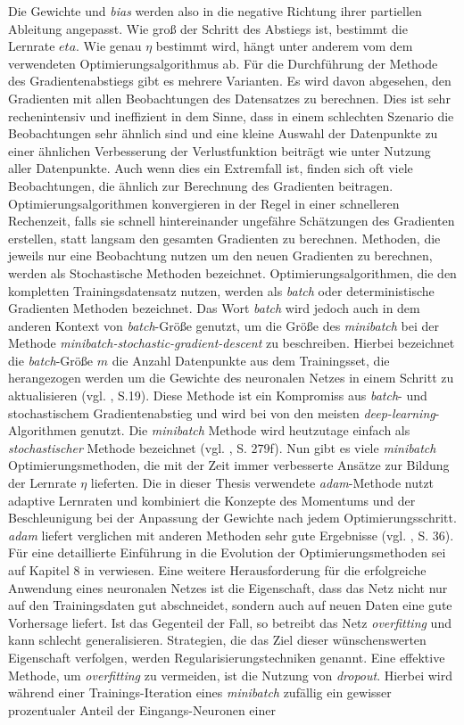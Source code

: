 \documentclass[a4paper,11pt]{article}
\begin{document}
Die Gewichte und \textit{bias} werden also in die negative Richtung ihrer partiellen Ableitung angepasst. Wie groß der Schritt des Abstiegs ist, bestimmt die Lernrate $eta$. 
Wie genau $\eta$ bestimmt wird, hängt unter anderem vom dem verwendeten Optimierungsalgorithmus ab. Für die Durchführung der Methode des Gradientenabstiegs gibt es mehrere Varianten. Es wird davon abgesehen, den Gradienten mit allen Beobachtungen des Datensatzes zu berechnen. Dies ist sehr rechenintensiv und ineffizient in dem Sinne, dass in einem schlechten Szenario die Beobachtungen sehr ähnlich sind und eine kleine Auswahl der Datenpunkte zu einer ähnlichen Verbesserung der Verlustfunktion beiträgt wie unter Nutzung aller Datenpunkte. Auch wenn dies ein Extremfall ist, finden sich oft viele Beobachtungen, die ähnlich zur Berechnung des Gradienten beitragen. Optimierungsalgorithmen konvergieren in der Regel in einer schnelleren Rechenzeit, falls sie schnell hintereinander ungefähre Schätzungen des Gradienten erstellen, statt langsam den gesamten Gradienten zu berechnen. Methoden, die jeweils nur eine Beobachtung nutzen um den neuen Gradienten zu berechnen, werden als Stochastische Methoden bezeichnet. Optimierungsalgorithmen, die den kompletten Trainingsdatensatz nutzen, werden als \textit{batch} oder deterministische Gradienten Methoden bezeichnet. Das Wort \textit{batch} wird jedoch auch in dem anderen Kontext von \textit{batch}-Größe genutzt, um die Größe des \textit{minibatch} bei der Methode \textit{minibatch-stochastic-gradient-descent} zu beschreiben. Hierbei bezeichnet die \textit{batch}-Größe $m$ die Anzahl Datenpunkte aus dem Trainingsset, die herangezogen werden um die Gewichte des neuronalen Netzes in einem Schritt zu aktualisieren (vgl. \cite{keras}, S.19). Diese Methode ist ein Kompromiss aus \textit{batch}- und stochastischem Gradientenabstieg und wird bei von den meisten \textit{deep-learning}-Algorithmen genutzt. Die \textit{minibatch} Methode wird heutzutage einfach als \textit{stochastischer} Methode bezeichnet (vgl. \cite{deepL}, S. 279f). Nun gibt es viele \textit{minibatch} Optimierungsmethoden, die mit der Zeit immer verbesserte Ansätze zur Bildung der Lernrate $\eta$ lieferten. Die in dieser Thesis verwendete \textit{adam}-Methode nutzt adaptive Lernraten und kombiniert die Konzepte des Momentums und der Beschleunigung bei der Anpassung der Gewichte nach jedem Optimierungsschritt. \textit{adam} liefert verglichen mit anderen Methoden sehr gute Ergebnisse (vgl. \cite{keras}, S. 36). Für eine detaillierte Einführung in die Evolution der Optimierungsmethoden sei auf Kapitel 8 in \cite{deepL} verwiesen. Eine weitere Herausforderung für die erfolgreiche Anwendung eines neuronalen Netzes ist die Eigenschaft, dass das Netz nicht nur auf den Trainingsdaten gut abschneidet, sondern auch auf neuen Daten eine gute Vorhersage liefert. Ist das Gegenteil der Fall, so betreibt das Netz \textit{overfitting} und kann schlecht generalisieren. Strategien, die das Ziel dieser wünschenswerten Eigenschaft verfolgen, werden Regularisierungstechniken genannt. Eine effektive Methode, um \textit{overfitting} zu vermeiden, ist die Nutzung von \textit{dropout}. Hierbei wird während einer Trainings-Iteration eines \textit{minibatch} zufällig ein gewisser prozentualer Anteil der Eingangs-Neuronen einer 
\end{document}
